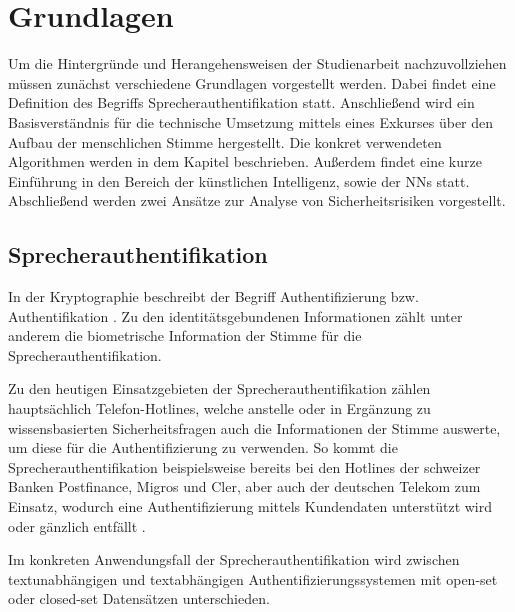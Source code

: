 \section{Grundlagen}

\textauthor{\vJB,}{\vLB,}{\vHS}

Um die Hintergründe und Herangehensweisen der Studienarbeit nachzuvollziehen müssen zunächst verschiedene Grundlagen vorgestellt werden.
Dabei findet eine Definition des Begriffs Sprecherauthentifikation statt.
Anschließend wird ein Basisverständnis für die technische Umsetzung mittels eines Exkurses über den Aufbau der menschlichen Stimme hergestellt.
Die konkret verwendeten Algorithmen werden in dem Kapitel  beschrieben.
Außerdem findet eine kurze Einführung in den Bereich der künstlichen Intelligenz, sowie der \acp{NN} statt.
Abschließend werden zwei Ansätze zur Analyse von Sicherheitsrisiken vorgestellt.

\subsection{Sprecherauthentifikation}

\textauthor{\vHS}{}{}

In der Kryptographie beschreibt der Begriff Authentifizierung bzw. Authentifikation  \autocite[][S. 129]{tsolkas_rollen_2017}.
Zu den identitätsgebundenen Informationen zählt unter anderem die biometrische Information der Stimme für die Sprecherauthentifikation.

Zu den heutigen Einsatzgebieten der Sprecherauthentifikation zählen hauptsächlich Telefon-Hotlines, welche anstelle oder in Ergänzung zu wissensbasierten Sicherheitsfragen auch die Informationen der Stimme auswerte, um diese für die Authentifizierung zu verwenden.
So kommt die Sprecherauthentifikation beispielsweise bereits bei den Hotlines der schweizer Banken Postfinance, Migros und Cler, aber auch der deutschen Telekom zum Einsatz, wodurch eine Authentifizierung mittels Kundendaten unterstützt wird oder gänzlich entfällt \autocite[vgl.][]{anz_mit_2023} \autocite[vgl.][]{noauthor_authentifizierung_nodate} \autocite[vgl.][]{noauthor_meine_nodate}.

Im konkreten Anwendungsfall der Sprecherauthentifikation wird zwischen textunabhängigen und textabhängigen Authentifizierungssystemen mit open-set oder closed-set Datensätzen unterschieden.

